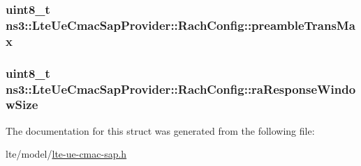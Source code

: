 \subsubsection[{\texorpdfstring{preamble\+Trans\+Max}{preambleTransMax}}]{\setlength{\rightskip}{0pt plus 5cm}uint8\+\_\+t ns3\+::\+Lte\+Ue\+Cmac\+Sap\+Provider\+::\+Rach\+Config\+::preamble\+Trans\+Max}\hypertarget{structns3_1_1LteUeCmacSapProvider_1_1RachConfig_a38393266a15affdc58b861f7b8e35aee}{}\label{structns3_1_1LteUeCmacSapProvider_1_1RachConfig_a38393266a15affdc58b861f7b8e35aee}
\subsubsection[{\texorpdfstring{ra\+Response\+Window\+Size}{raResponseWindowSize}}]{\setlength{\rightskip}{0pt plus 5cm}uint8\+\_\+t ns3\+::\+Lte\+Ue\+Cmac\+Sap\+Provider\+::\+Rach\+Config\+::ra\+Response\+Window\+Size}\hypertarget{structns3_1_1LteUeCmacSapProvider_1_1RachConfig_a1a14230a2498262be3a985604ce5eaf0}{}\label{structns3_1_1LteUeCmacSapProvider_1_1RachConfig_a1a14230a2498262be3a985604ce5eaf0}


The documentation for this struct was generated from the following file\+:\begin{DoxyCompactItemize}
\item 
lte/model/\hyperlink{lte-ue-cmac-sap_8h}{lte-\/ue-\/cmac-\/sap.\+h}\end{DoxyCompactItemize}
